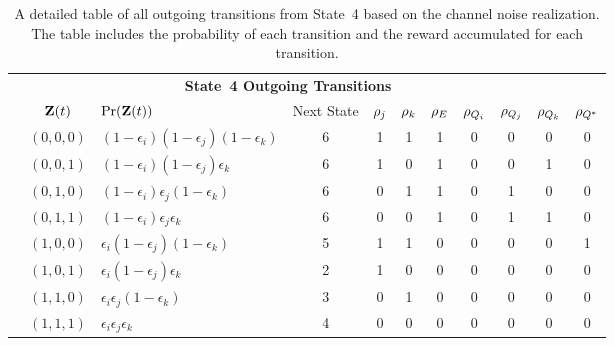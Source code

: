 
\setcounter{mymagicrownumbers}{0} 

\begin{table}
	\begin{center}
		\begin{tabular}{c c l *{8}{c}}
			\multicolumn{10}{c}{{\bf State~4 Outgoing Transitions}} \\		
			& $\mathbf{Z}(t)$              & $\operatorname{Pr}(\mathbf{Z}(t))$ & Next State & $\rho_{j}$ & $\rho_{k}$ & $\rho_{E}$ & $\rho_{Q_{i}}$ & $\rho_{Q_{j}}$ & $\rho_{Q_{k}}$ & $\rho_{Q^{*}}$\\
			\hline
			\myrownumber & $(0, 0, 0)$ & $(1 -\epsilon_i)(1 -\epsilon_j)(1 - \epsilon_k)$ & 6 &1 & 1 & 1 & 0 & 0 & 0 & 0 \\
			\myrownumber & $(0, 0, 1)$ & $(1 -\epsilon_i)(1 -\epsilon_j)\epsilon_k$ & 6 &1 & 0 & 1 & 0 & 0 & 1 & 0 \\
			\myrownumber & $(0, 1, 0)$ & $(1 -\epsilon_i)\epsilon_j(1 - \epsilon_k)$ & 6 & 0 & 1 & 1 & 0 & 1 & 0 & 0 \\
			\myrownumber & $(0, 1, 1)$ & $(1 -\epsilon_i)\epsilon_j\epsilon_k$ & 6 & 0 & 0 & 1 & 0 & 1 & 1 & 0 \\
			\myrownumber & $(1, 0, 0)$ & $\epsilon_i(1 -\epsilon_j)(1 - \epsilon_k)$ & 5 & 1 & 1 & 0 & 0 & 0 & 0 & 1 \\
			\myrownumber & $(1, 0, 1)$ & $\epsilon_i(1 -\epsilon_j)\epsilon_k$ & 2 &1 & 0 & 0 & 0 & 0 & 0 & 0 \\							\myrownumber & $(1, 1, 0)$ & $\epsilon_i\epsilon_j(1 - \epsilon_k)$ & 3 &0 & 1 & 0 & 0 & 0 & 0 & 0 \\
			\myrownumber & $(1, 1, 1)$ & $\epsilon_i\epsilon_j\epsilon_k$ & 4 &0 & 0 & 0 & 0 & 0 & 0 & 0 \\
		\end{tabular}
	\end{center}
	\caption{A detailed table of all outgoing transitions from State~4 based on the channel noise realization.  The table includes the probability of each transition and the reward accumulated for each transition.}	
	\label{tab:state4_transitions_all}
\end{table}

\setcounter{mymagicrownumbers}{0} 
